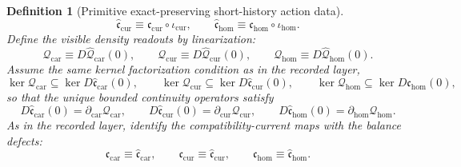 \documentclass[11pt]{article}
\newcommand{\TensorDensity}{\mathcal Q_{\mathrm{car}}}
\newcommand{\CurDensity}{\mathcal Q_{\mathrm{cur}}}
\newcommand{\HomDensity}{\mathcal Q_{\mathrm{hom}}}
\newcommand{\TensorCont}{\partial_{\mathrm{car}}}
\newcommand{\CurCont}{\partial_{\mathrm{cur}}}
\newcommand{\HomCont}{\partial_{\mathrm{hom}}}
\newcommand{\TensorCurrent}{\mathfrak c_{\mathrm{car}}}
\newcommand{\CurCurrent}{\mathfrak c_{\mathrm{cur}}}
\newcommand{\HomCurrent}{\mathfrak c_{\mathrm{hom}}}
\newcommand{\CurStateEmbed}{\iota_{\mathrm{cur}}}
\newcommand{\HomStateEmbed}{\iota_{\mathrm{hom}}}
\newcommand{\CurRawBalance}{\boldsymbol{\mathfrak c}_{\mathrm{cur}}}
\newcommand{\HomRawBalance}{\boldsymbol{\mathfrak c}_{\mathrm{hom}}}
\newcommand{\TensorPrimitiveDensity}{\widehat{\mathcal Q}_{\mathrm{car}}}
\newcommand{\CurPrimitiveDensity}{\widehat{\mathcal Q}_{\mathrm{cur}}}
\newcommand{\HomPrimitiveDensity}{\widehat{\mathcal Q}_{\mathrm{hom}}}
\newcommand{\TensorBalance}{\widehat{\mathfrak c}_{\mathrm{car}}}
\newcommand{\CurBalance}{\widehat{\mathfrak c}_{\mathrm{cur}}}
\newcommand{\HomBalance}{\widehat{\mathfrak c}_{\mathrm{hom}}}
\newtheorem{definition}{Definition}
\begin{document}
\begin{definition}[Primitive exact-preserving short-history action data]
\begin{equation}
\CurBalance\equiv\CurRawBalance\circ\CurStateEmbed,\qquad
\HomBalance\equiv\HomRawBalance\circ\HomStateEmbed.
\label{eq:history_primitive_balance}
\end{equation}
Define the visible density readouts by linearization:
\begin{equation}
\TensorDensity\equiv D\TensorPrimitiveDensity(0),\qquad
\CurDensity\equiv D\CurPrimitiveDensity(0),\qquad
\HomDensity\equiv D\HomPrimitiveDensity(0).
\label{eq:history_visible_density}
\end{equation}
Assume the same kernel factorization condition as in the recorded layer,
\begin{equation}
\ker\TensorDensity\subseteq\ker D\TensorBalance(0),\qquad
\ker\CurDensity\subseteq\ker D\CurBalance(0),\qquad
\ker\HomDensity\subseteq\ker D\HomBalance(0),
\label{eq:history_kernel_factor}
\end{equation}
so that the unique bounded continuity operators satisfy
\begin{equation}
D\TensorBalance(0)=\TensorCont\TensorDensity,\qquad
D\CurBalance(0)=\CurCont\CurDensity,\qquad
D\HomBalance(0)=\HomCont\HomDensity.
\label{eq:history_continuity_factor}
\end{equation}
As in the recorded layer, identify the compatibility-current maps with the balance defects:
\begin{equation}
\TensorCurrent\equiv\TensorBalance,\qquad
\CurCurrent\equiv\CurBalance,\qquad
\HomCurrent\equiv\HomBalance.
\label{eq:history_currents}
\end{equation}
\end{definition}
\end{document}

